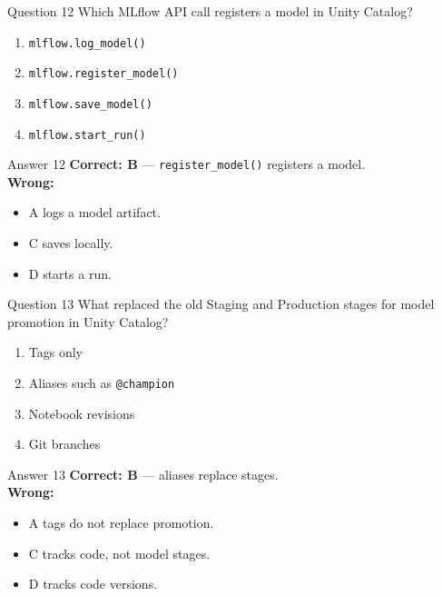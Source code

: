 \documentclass[aspectratio=169,11pt]{beamer}
\begin{document}
	\begin{frame}{Question 12}
		Which MLflow API call registers a model in Unity Catalog?
		\begin{enumerate}[label=\Alph*.]
			\item \texttt{mlflow.log\_model()}
			\item \texttt{mlflow.register\_model()}
			\item \texttt{mlflow.save\_model()}
			\item \texttt{mlflow.start\_run()}
		\end{enumerate}
	\end{frame}
	\begin{frame}{Answer 12}
		\textbf{Correct: B} --- \texttt{register\_model()} registers a model.\\
		\vspace{0.5em}
		\textbf{Wrong:}
		\begin{itemize}
			\item A logs a model artifact.
			\item C saves locally.
			\item D starts a run.
		\end{itemize}
	\end{frame}
	
	\begin{frame}{Question 13}
		What replaced the old Staging and Production stages for model promotion in Unity Catalog?
		\begin{enumerate}[label=\Alph*.]
			\item Tags only
			\item Aliases such as \texttt{@champion}
			\item Notebook revisions
			\item Git branches
		\end{enumerate}
	\end{frame}
	\begin{frame}{Answer 13}
		\textbf{Correct: B} --- aliases replace stages.\\
		\vspace{0.5em}
		\textbf{Wrong:}
		\begin{itemize}
			\item A tags do not replace promotion.
			\item C tracks code, not model stages.
			\item D tracks code versions.
		\end{itemize}
	\end{frame}
	
\end{document}
